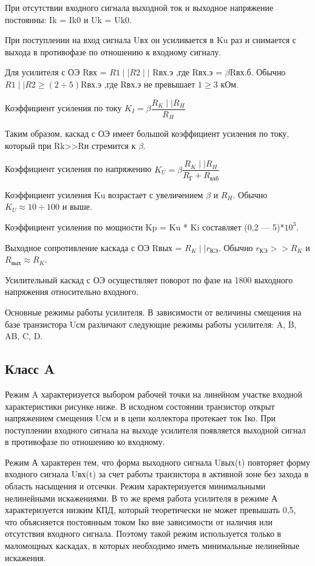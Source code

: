 При отсутствии входного сигнала выходной ток и выходное напряжение постоянны: Ik = Ik0 и Uk = Uk0.

При поступлении на вход сигнала Uвх он усиливается в Ku раз и снимается с выхода в противофазе по отношению к входному сигналу.

Для усилителя с ОЭ Rвх = $R1 \mid\mid R2 \mid\mid$ Rвх.э ,где Rвх.э = $\beta$Rвх.б. Обычно $R1 \mid\mid R2 \geq (2 \div 5)$Rвх.э ,где Rвх.э не превышает $1 \geq 3$ кОм.

Коэффициент усиления по току $K_I = \beta \dfrac{R_K  \mid\mid R_H}{R_H}$

Таким образом, каскад с ОЭ имеет большой коэффициент усиления по току, который  при Rk>>Rн стремится к $\beta$.

Коэффициент усиления по напряжению $K_U = \beta \dfrac{R_K  \mid\mid R_H}{R_\text{Г} + R_\text{вхб}}$

Коэффициент усиления Ku возрастает с увеличением $\beta$ и $R_H$. Обычно $K_U \approx 10 \div 100$ и выше.

Коэффициент усиления по мощности Kp = Ku * Ki составляет (0,2 --- 5)*$10^3$.

Выходное сопротивление каскада с ОЭ Rвых = $R_K \mid\mid r_\text{КЭ}$. Обычно $r_\text{КЭ} >> R_K$ и $R_\text{вых} \approx R_K$.

Усилительный каскад с ОЭ осуществляет поворот по фазе на 1800 выходного напряжения относительно входного.

Основные режимы работы усилителя. В зависимости от величины смещения на базе транзистора Uсм различают следующие режимы работы усилителя: A, B, AB, C, D.

\subsection*{Класс A}

Режим A характеризуется выбором рабочей точки на линейном участке входной характеристики рисунке ниже. В исходном состоянии транзистор открыт напряжением смещения Uсм и в цепи коллектора протекает ток Iко. При поступлении входного сигнала на выходе усилителя появляется выходной сигнал в противофазе по отношению ко входному.

Режим А характерен тем, что форма выходного сигнала Uвых(t) повторяет форму входного сигнала Uвх(t) за счет работы транзистора в активной зоне без захода в область насыщения и отсечки. Режим характеризуется минимальными нелинейными искажениями.
В то же время работа усилителя в режиме А характеризуется низким КПД, который теоретически не может превышать 0,5, что объясняется постоянным током Iко вне зависимости от наличия или отсутствия входного сигнала. Поэтому такой режим используется только в маломощных каскадах, в которых необходимо иметь минимальные нелинейные искажения.

